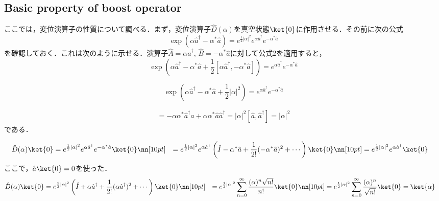 \subsection{Basic property of boost operator}
ここでは，変位演算子の性質について調べる．まず，変位演算子$\hat{D}(\alpha)$を真空状態$\ket{0}$に作用させる．その前に次の公式
\begin{equation}
    \exp{\left(\alpha\hat{a}^\dagger-\alpha^\ast\hat{a}\right)}
    =e^{\frac{1}{2}|\alpha|^2}e^{\alpha\hat{a}^\dagger}e^{-\alpha^\ast\hat{a}}
\end{equation}
を確認しておく．これは次のように示せる．演算子$\hat{A}=\alpha\hat{a}^\dagger$, $\hat{B}=-\alpha^\ast\hat{a}$に対して公式2を適用すると，
\begin{equation}
    \exp{\left(\alpha\hat{a}^\dagger-\alpha^\ast\hat{a}+\frac{1}{2}[\alpha\hat{a}^\dagger, -\alpha^\ast\hat{a}]\right)}
    =e^{\alpha\hat{a}^\dagger}e^{-\alpha^\ast\hat{a}}
\end{equation}

\begin{equation}
    \exp{\left(\alpha\hat{a}^\dagger-\alpha^\ast\hat{a}+\frac{1}{2}|\alpha|^2\right)}
    =e^{\alpha\hat{a}^\dagger}e^{-\alpha^\ast\hat{a}}
\end{equation}

\begin{align}
    [\alpha\hat{a}^\dagger, -\alpha^\ast\hat{a}]
    =-\alpha\alpha^\ast\hat{a}^\dagger\hat{a}
    +\alpha\alpha^\ast\hat{a}\hat{a}^\dagger
    =|\alpha|^2 [\hat{a}, \hat{a}^\dagger]=|\alpha|^2
\end{align}
である．

\begin{align}
    \hat{D}(\alpha)\ket{0}
    &=e^{\frac{1}{2}|\alpha|^2}e^{\alpha\hat{a}^\dagger}e^{-\alpha^\ast\hat{a}}\ket{0}\nn[10pt]
    &=e^{\frac{1}{2}|\alpha|^2}e^{\alpha\hat{a}^\dagger}
    \left(
    \hat{I}-\alpha^\ast\hat{a}+\frac{1}{2!}(-\alpha^\ast\hat{a})^2+\cdots
    \right)\ket{0}\nn[10pt]
    &=e^{\frac{1}{2}|\alpha|^2}e^{\alpha\hat{a}^\dagger}\ket{0}
\end{align}
ここで，$\hat{a}\ket{0}=0$を使った．
\begin{align}
    \hat{D}(\alpha)\ket{0}
    &=e^{\frac{1}{2}|\alpha|^2}
    \left(
    \hat{I}+\alpha\hat{a}^\dagger+\frac{1}{2!}(\alpha\hat{a}^\dagger)^2+\cdots
    \right)\ket{0}\nn[10pt]
    &=e^{\frac{1}{2}|\alpha|^2}\sum_{n=0}^{\infty}\frac{(\alpha)^n\sqrt{n!}}{n!}\ket{0}\nn[10pt]
    &=e^{\frac{1}{2}|\alpha|^2}\sum_{n=0}^{\infty}\frac{(\alpha)^n}{\sqrt{n!}}\ket{0}
    =\ket{\alpha}
\end{align}


